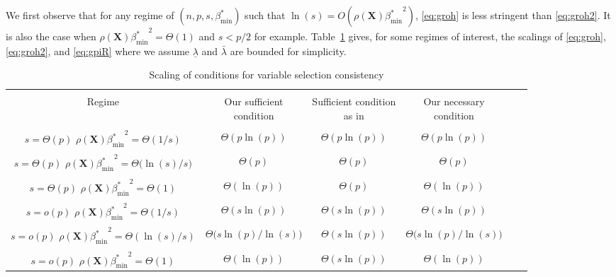 \documentclass[bj,authoryear]{imsart}
\theoremstyle{plain}
\newcommand{\paul}[1]{{\small{\color{green} \sf $\spadesuit$ Paul: #1}}}
\newcommand{\bs}{\boldsymbol}
\begin{document}
We first observe that for any regime of $(n,p,s,\beta_{\min}^*)$ such that $\ln(s)=O(\rho(\bs X){\beta_{\min}^*}^2)$, \eqref{eq:groh} is less stringent than \eqref{eq:groh2}. It is also the case when $\rho(\bs X){\beta_{\min}^*}^2=\Theta(1)$ and $s<p/2$ for example. Table~\ref{tab:scalings} gives, for some regimes of interest, the scalings of \eqref{eq:groh}, \eqref{eq:groh2}, and \eqref{eq:gpiR} where we assume $\underline{\lambda}$ and $\bar{\lambda}$ are bounded for simplicity.
\begin{table}[ht]
\caption{Scaling of conditions for variable selection consistency}
\label{tab:scalings}
\begin{tabular}{@{}cccccc@{}}
\hline \\[-1em]
Regime & \thead{Our sufficient \\ condition} & \thead{Sufficient condition\\ as in \cite{infotheowainwright}} & \thead{Our necessary \\ condition} \\
\hline\\[-1em]
\thead{$s=\Theta(p)$\\$\rho(\bs X){\beta_{\min}^*}^2=\Theta(1/s)$}    & $\Theta(p\ln(p))$ & $\Theta(p\ln(p))$ & $\Theta(p\ln(p))$ \\\hline\\[-1em]
\thead{$s=\Theta(p)$\\$\rho(\bs X){\beta_{\min}^*}^2=\Theta\big(\ln(s)/s\big)$}    & $\Theta(p)$ & $\Theta(p)$ & $\Theta(p)$ \\\hline\\[-1em]
\thead{$s=\Theta(p)$\\$\rho(\bs X){\beta_{\min}^*}^2=\Theta(1)$}   & $\Theta(\ln(p))$ & $\Theta(p)$ & $\Theta(\ln(p))$ \\\hline\\[-1em]
\thead{$s=o(p)$\\$\rho(\bs X){\beta_{\min}^*}^2=\Theta(1/s)$}    & $\Theta(s\ln(p))$ & $\Theta(s\ln(p))$ & $\Theta(s\ln(p))$ \\\hline\\[-1em]
\thead{$s=o(p)$\\$\rho(\bs X){\beta_{\min}^*}^2=\Theta(\ln(s)/s)$}    & $\Theta\big(s\ln(p)/\ln(s)\big)$ & $\Theta(s\ln(p))$ & $\Theta\big(s\ln(p)/\ln(s)\big)$ \\\hline\\[-1em]
\thead{$s=o(p)$\\$\rho(\bs X){\beta_{\min}^*}^2=\Theta(1)$}    & $\Theta(\ln(p))$ & $\Theta(s\ln(p))$ & $\Theta(\ln(p))$ \\\hline
\end{tabular}
\end{table}
\end{document}
